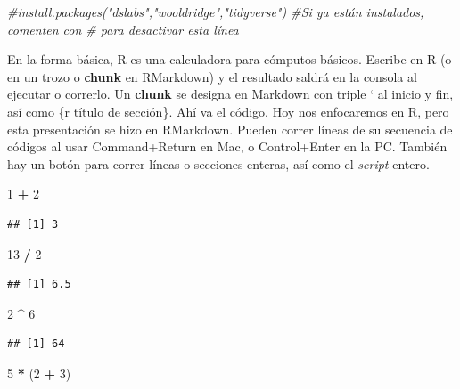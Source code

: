 \documentclass[
]{article}
\newenvironment{Shaded}{\begin{snugshade}}{\end{snugshade}}
\newcommand{\CommentTok}[1]{\textcolor[rgb]{0.56,0.35,0.01}{\textit{#1}}}
\newcommand{\DecValTok}[1]{\textcolor[rgb]{0.00,0.00,0.81}{#1}}
\newcommand{\NormalTok}[1]{#1}
\newcommand{\SpecialCharTok}[1]{\textcolor[rgb]{0.81,0.36,0.00}{\textbf{#1}}}
\begin{document}
\begin{Shaded}
\begin{Highlighting}[]
\CommentTok{\#install.packages("dslabs","wooldridge","tidyverse") \#Si ya están instalados, comenten con \textquotesingle{}\#\textquotesingle{} para desactivar esta línea}
\end{Highlighting}
\end{Shaded}

En la forma básica, R es una calculadora para cómputos básicos. Escribe
en R (o en un trozo o \textbf{chunk} en RMarkdown) y el resultado saldrá
en la consola al ejecutar o correrlo. Un \textbf{chunk} se designa en
Markdown con triple ` al inicio y fin, así como \{r título de sección\}.
Ahí va el código. Hoy nos enfocaremos en R, pero esta presentación se
hizo en RMarkdown. Pueden correr líneas de su secuencia de códigos al
usar Command+Return en Mac, o Control+Enter en la PC. También hay un
botón para correr líneas o secciones enteras, así como el \emph{script}
entero.

\begin{Shaded}
\begin{Highlighting}[]
\DecValTok{1} \SpecialCharTok{+} \DecValTok{2}
\end{Highlighting}
\end{Shaded}

\begin{verbatim}
## [1] 3
\end{verbatim}

\begin{Shaded}
\begin{Highlighting}[]
\DecValTok{13} \SpecialCharTok{/} \DecValTok{2}
\end{Highlighting}
\end{Shaded}

\begin{verbatim}
## [1] 6.5
\end{verbatim}

\begin{Shaded}
\begin{Highlighting}[]
\DecValTok{2} \SpecialCharTok{\^{}} \DecValTok{6}
\end{Highlighting}
\end{Shaded}

\begin{verbatim}
## [1] 64
\end{verbatim}

\begin{Shaded}
\begin{Highlighting}[]
\DecValTok{5} \SpecialCharTok{*}\NormalTok{ (}\DecValTok{2} \SpecialCharTok{+} \DecValTok{3}\NormalTok{)}
\end{Highlighting}
\end{Shaded}
\end{document}
